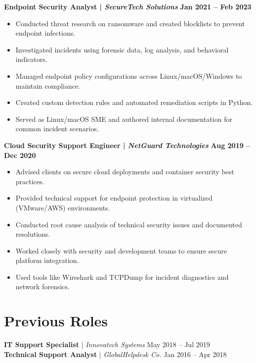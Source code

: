 \documentclass[a4paper,10pt]{article}
\begin{document}
\textbf{Endpoint Security Analyst | \textit{SecureTech Solutions}} \hfill \textbf{Jan 2021 – Feb 2023}
\begin{itemize}
    \item Conducted threat research on ransomware and created blocklists to prevent endpoint infections.
    \item Investigated incidents using forensic data, log analysis, and behavioral indicators.
    \item Managed endpoint policy configurations across Linux/macOS/Windows to maintain compliance.
    \item Created custom detection rules and automated remediation scripts in Python.
    \item Served as Linux/macOS SME and authored internal documentation for common incident scenarios.
\end{itemize}

\vspace{2mm}

\textbf{Cloud Security Support Engineer | \textit{NetGuard Technologies}} \hfill \textbf{Aug 2019 – Dec 2020}
\begin{itemize}
    \item Advised clients on secure cloud deployments and container security best practices.
    \item Provided technical support for endpoint protection in virtualized (VMware/AWS) environments.
    \item Conducted root cause analysis of technical security issues and documented resolutions.
    \item Worked closely with security and development teams to ensure secure platform integration.
    \item Used tools like Wireshark and TCPDump for incident diagnostics and network forensics.
\end{itemize}

\vspace{2mm}

\section*{Previous Roles}
\textbf{IT Support Specialist} | \textit{Innovatech Systems} \hfill May 2018 – Jul 2019 \\
\textbf{Technical Support Analyst} | \textit{GlobalHelpdesk Co.} \hfill Jan 2016 – Apr 2018

\vspace{2mm}
\end{document}
